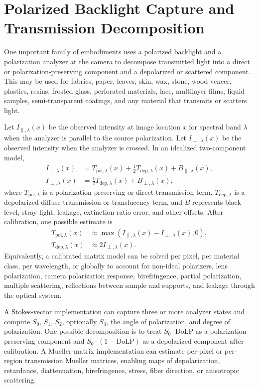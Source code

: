 \documentclass[11pt, twoside, listof=totocnumbered, bibliography=totocnumbered]{scrartcl}
\begin{document}
	\section{Polarized Backlight Capture and Transmission Decomposition}
	One important family of embodiments uses a polarized backlight and a polarization analyzer at the camera to decompose transmitted light into a direct or polarization-preserving component and a depolarized or scattered component. This may be used for fabrics, paper, leaves, skin, wax, stone, wood veneer, plastics, resins, frosted glass, perforated materials, lace, multilayer films, liquid samples, semi-transparent coatings, and any material that transmits or scatters light.
	
	Let $I_{\parallel,\lambda}(x)$ be the observed intensity at image location $x$ for spectral band $\lambda$ when the analyzer is parallel to the source polarization. Let $I_{\perp,\lambda}(x)$ be the observed intensity when the analyzer is crossed. In an idealized two-component model,
	\begin{align}
		I_{\parallel,\lambda}(x) &= T_{\mathrm{pol},\lambda}(x) + \frac{1}{2}T_{\mathrm{dep},\lambda}(x) + B_{\parallel,\lambda}(x),\\
		I_{\perp,\lambda}(x) &= \frac{1}{2}T_{\mathrm{dep},\lambda}(x) + B_{\perp,\lambda}(x),
	\end{align}
	where $T_{\mathrm{pol},\lambda}$ is a polarization-preserving or direct transmission term, $T_{\mathrm{dep},\lambda}$ is a depolarized diffuse transmission or translucency term, and $B$ represents black level, stray light, leakage, extinction-ratio error, and other offsets. After calibration, one possible estimate is
	\begin{align}
		T_{\mathrm{pol},\lambda}(x) &\approx \max(I_{\parallel,\lambda}(x) - I_{\perp,\lambda}(x), 0),\\
		T_{\mathrm{dep},\lambda}(x) &\approx 2 I_{\perp,\lambda}(x).
	\end{align}
	Equivalently, a calibrated matrix model can be solved per pixel, per material class, per wavelength, or globally to account for non-ideal polarizers, lens polarization, camera polarization response, birefringence, partial polarization, multiple scattering, reflections between sample and supports, and leakage through the optical system.
	
	A Stokes-vector implementation can capture three or more analyzer states and compute $S_0$, $S_1$, $S_2$, optionally $S_3$, the angle of polarization, and degree of polarization. One possible decomposition is to treat $S_0 \cdot \mathrm{DoLP}$ as a polarization-preserving component and $S_0 \cdot (1-\mathrm{DoLP})$ as a depolarized component after calibration. A Mueller-matrix implementation can estimate per-pixel or per-region transmission Mueller matrices, enabling maps of depolarization, retardance, diattenuation, birefringence, stress, fiber direction, or anisotropic scattering.
	
\end{document}
